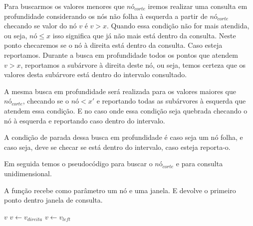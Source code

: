 Para buscarmos os valores menores que $nó_{corte}$ iremos realizar uma consulta em profundidade considerando
os nós não folha à esquerda a partir de $nó_{corte}$ checando se valor do nó $v$ é $v > x$. 
Quando essa condição não for mais atendida, ou seja, $nó \leq x$  isso significa que já não mais está
dentro da consulta. Neste ponto checaremos se o nó à direita está dentro da consulta. Caso esteja reportamos.
Durante a busca em profundidade todos os pontos que atendem $v > x$, reportamos a subárvore à direita
deste nó, ou seja, temos certeza que os valores desta subárvore está dentro do intervalo consultado.

A mesma busca em profundidade será realizada para os valores maiores que $nó_{corte}$, checando se 
o $nó < x'$ e reportando todas as subárvores à esquerda que atendem essa condição. E no caso onde essa
condição seja quebrada checando o nó à esquerda e reportando caso dentro do intervalo.

A condição de parada dessa busca em profundidade é caso seja um nó folha, e caso seja, deve se checar
se está dentro do intervalo, caso esteja reporta-o.

Em seguida temos o pseudocódigo para buscar o $nó_{corte}$ e para consulta unidimensional.

\begin{algorithm}[H]
    \caption{A função  recebe como parâmetro um nó e uma 
    janela.
     E devolve o primeiro ponto dentro janela de consulta.}
    \begin{algorithmic}[1]
            \Return $v$
        \Else
                \State $v \leftarrow v_{direita}$ 
            \Else
                \State $v \leftarrow v_{left}$
            \EndIf
        \EndIf
    \EndFunction
    \end{algorithmic}
\end{algorithm}
\clearpage


